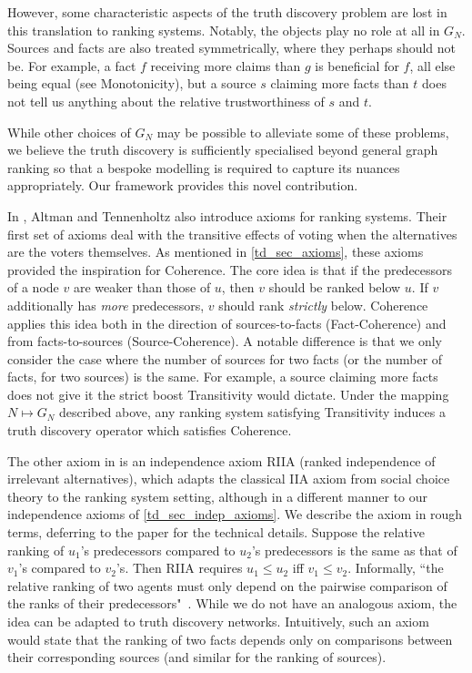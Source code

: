 However, some characteristic aspects of the truth discovery problem are lost in
this translation to ranking systems. Notably, the objects play no role at all
in $G_N$. Sources and facts are also treated symmetrically, where they perhaps
should not be. For example, a fact $f$ receiving more claims than $g$ is
beneficial for $f$, all else being equal (see Monotonicity), but a source $s$
claiming more facts than $t$ does not tell us anything about the relative
trustworthiness of $s$ and $t$.

While other choices of $G_N$ may be possible to alleviate some of these
problems, we believe the truth discovery is sufficiently specialised beyond
general graph ranking so that a bespoke modelling is required to capture its
nuances appropriately. Our framework provides this novel contribution.

In \cite{altman2008}, Altman and Tennenholtz also introduce axioms for ranking
systems. Their first set of axioms deal with the transitive effects of voting
when the alternatives are the voters themselves. As mentioned in
\cref{td_sec_axioms}, these axioms provided the inspiration for Coherence. The
core idea is that if the predecessors of a node $v$ are weaker than those of
$u$, then $v$ should be ranked below $u$. If $v$ additionally has \emph{more}
predecessors, $v$ should rank \emph{strictly} below. Coherence applies this
idea both in the direction of sources-to-facts (Fact-Coherence) and from
facts-to-sources (Source-Coherence). A notable difference is that we only
consider the case where the number of sources for two facts (or the number of
facts, for two sources) is the same. For example, a source claiming more facts
does not give it the strict boost Transitivity would dictate. Under the mapping $N
\mapsto G_N$ described above, any ranking system satisfying Transitivity
induces a truth discovery operator which satisfies Coherence.

The other axiom in \cite{altman2008} is an independence axiom RIIA (ranked
independence of irrelevant alternatives), which adapts the classical IIA axiom
from social choice theory to the ranking system setting, although in a
different manner to our independence axioms of \cref{td_sec_indep_axioms}. We
describe the axiom in rough terms, deferring to the paper for the technical
details. Suppose the relative ranking of $u_1$'s predecessors compared to
$u_2$'s predecessors is the same as that of $v_1$'s compared to $v_2$'s. Then
RIIA requires $u_1 \le u_2$ iff $v_1 \le v_2$. Informally, ``the relative
ranking of two agents must only depend on the pairwise comparison of the ranks
of their predecessors"~\cite{altman2008}.
%
While we do not have an analogous axiom, the idea can be adapted to truth
discovery networks. Intuitively, such an axiom would state that the ranking of
two facts depends only on comparisons between their
corresponding sources (and similar for the ranking of sources).

